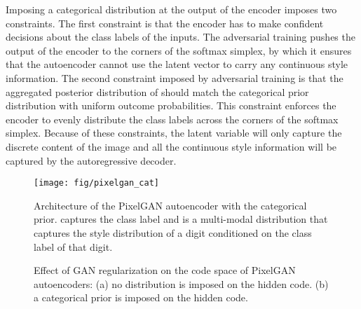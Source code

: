 \documentclass{article}
\begin{document}
Imposing a categorical distribution at the output of the encoder imposes two constraints. The first constraint is that the encoder has to make confident decisions about the class labels of the inputs. The adversarial training pushes the output of the encoder to the corners of the softmax simplex, by which it ensures that the autoencoder cannot use the latent vector  to carry any continuous style information. The second constraint imposed by adversarial training is that the aggregated posterior distribution of  should match the categorical prior distribution with uniform outcome probabilities. This constraint enforces the encoder to evenly distribute the class labels across the corners of the softmax simplex. Because of these constraints, the latent variable will only capture the discrete content of the image and all the continuous style information will be captured by the autoregressive decoder. 

\begin{figure}[t]
\begin{center}
\hspace{4cm}\texttt{[image: fig/pixelgan\_cat]}
\end{center}
\vspace{-.3cm}
\caption{\label{fig:pixelgan_cat}Architecture of the PixelGAN autoencoder with the categorical prior.  captures the class label and  is a multi-modal distribution that captures the style distribution of a digit conditioned on the class label of that digit.}
\end{figure}

\begin{figure}[b]
\centering
{}
\hspace{1cm}
\vspace{-.3cm}
\caption{\label{fig:pixelgan_cluster_toy}{Effect of GAN regularization on the code space of PixelGAN autoencoders: (a) no distribution is imposed on the hidden code. (b) a categorical prior is imposed on the hidden code.}}
\end{figure}
\end{document}
